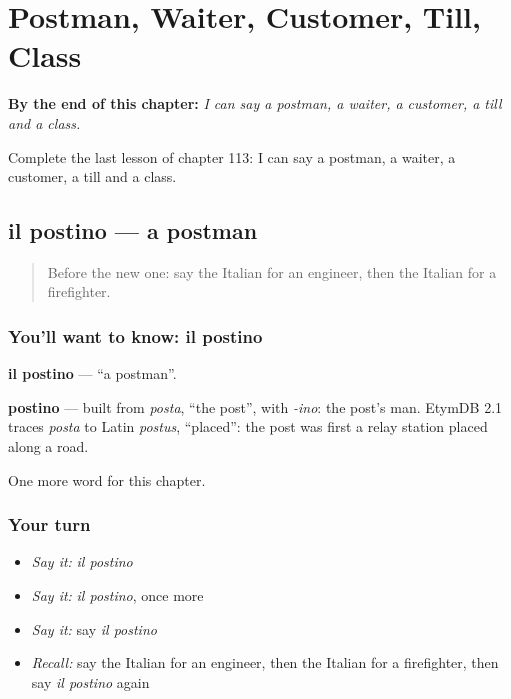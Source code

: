 
\chapter{Postman, Waiter, Customer, Till, Class}
\label{ch:it-postman-waiter-customer-till-class}

\begin{chapteropening}
\textbf{By the end of this chapter:} \emph{I can say a postman, a waiter, a customer, a till and a class.}

Complete the last lesson of chapter 113: I can say a postman, a waiter, a customer, a till and a class.
\end{chapteropening}

\section[il postino]{il postino — a postman}

\label{lesson:IT-C113-postino}



\begin{quote}
Before the new one: say the Italian for an engineer, then the Italian for a firefighter.
\end{quote}

\subsection*{You'll want to know: il postino}
\textbf{il postino} — \textquotedblleft{}a postman\textquotedblright{}.

\begin{cousinweb}
\textbf{postino} — built from \emph{posta}, \textquotedblleft{}the post\textquotedblright{}, with \emph{-ino}: the post's man. EtymDB 2.1 traces \emph{posta} to Latin \emph{postus}, \textquotedblleft{}placed\textquotedblright{}: the post was first a relay station placed along a road.
\end{cousinweb}

\begin{grammarlens}[title={What you've built}]
One more word for this chapter.
\end{grammarlens}

\subsection*{Your turn}
\begin{itemize}
\raggedright
  \item \emph{Say it:} \emph{il postino}
  \item \emph{Say it:} \emph{il postino}, once more
  \item \emph{Say it:} say \emph{il postino}
  \item \emph{Recall:} say the Italian for an engineer, then the Italian for a firefighter, then say \emph{il postino} again
\end{itemize}

